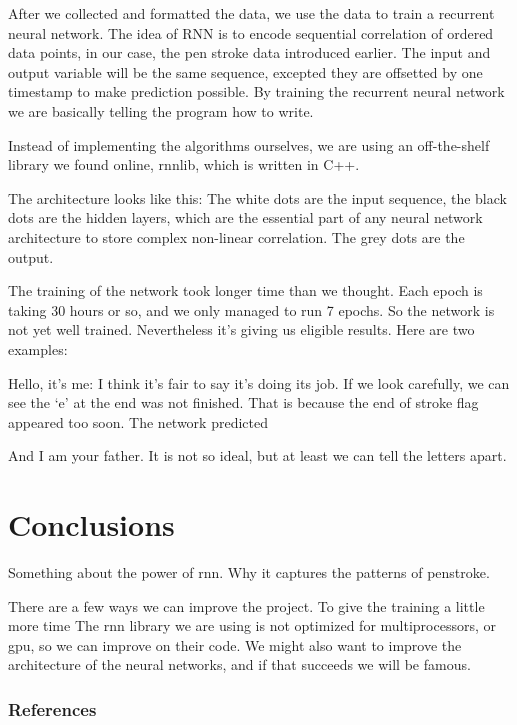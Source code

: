 \documentclass{article} %
\begin{document}
After we collected and formatted the data, we use the data to train a recurrent neural network. The idea of RNN is to encode sequential correlation of ordered data points, in our case, the pen stroke data introduced earlier. The input and output variable will be the same sequence, excepted they are offsetted by one timestamp to make prediction possible. By training the recurrent neural network we are basically telling the program how to write. 


Instead of implementing the algorithms ourselves, we are using an off-the-shelf library we found online, rnnlib, which is written in C++. 


The architecture looks like this: 
The white dots are the input sequence, the black dots are the hidden layers, which are the essential part of any neural network architecture to store complex non-linear correlation. The grey dots are the output. 


The training of the network took longer time than we thought. Each epoch is taking 30 hours or so, and we only managed to run 7 epochs. So the network is not yet well trained. Nevertheless it’s giving us eligible results. Here are two examples: 


Hello, it’s me: 
I think it’s fair to say it’s doing its job. 
If we look carefully, we can see the ‘e’ at the end was not finished. That is because the end of stroke flag appeared too soon. The network predicted 


And I am your father.  
It is not so ideal, but at least we can tell the letters apart. 





\section{Conclusions}
Something about the power of rnn. Why it captures the patterns of penstroke. 

There are a few ways we can improve the project. 
To give the training a little more time
The rnn library we are using is not optimized for multiprocessors, or gpu, so we can improve on their code. 
We might also want to improve the architecture of the neural networks, and if that succeeds we will be famous. 




\subsubsection*{References}
\end{document}
